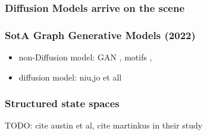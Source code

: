 \documentclass[./presentation.tex]{subfiles}
\begin{document}
\begin{frame}[label=working]
  \frametitle{Diffusion Models arrive on the scene}
\end{frame}

\begin{frame}[label=working]
  \frametitle{SotA Graph Generative Models (2022)}
  \begin{itemize}
    \item non-Diffusion model: GAN \cite{martinkusSPECTRESpectralConditioning2022b}, motifs \cite{maziarzLearningExtendMolecular2021},\cite{luoGraphDFDiscreteFlow2021d}
    \item diffusion model: niu,jo et all
  \end{itemize}
\end{frame}
\begin{frame}[label=working]
  \frametitle{Structured state spaces}
  TODO: cite austin et al, cite martinkus in their study
\end{frame}
\end{document}
